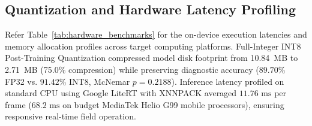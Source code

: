 \documentclass[conference,a4paper]{IEEEtran}
\begin{document}
\begin{table}[htbp]
\caption{Empirical Per-Class Evaluation on Test Set ($N=233$)}
\vspace{-2.5mm}
\centering
{}
\label{tab:metrics}
\vspace{-2.5mm}
\end{table}

\subsection{Quantization and Hardware Latency Profiling}
Refer Table~\ref{tab:hardware_benchmarks} for the on-device execution latencies and memory allocation profiles across target computing platforms. Full-Integer INT8 Post-Training Quantization compressed model disk footprint from 10.84~MB to 2.71~MB (75.0\% compression) while preserving diagnostic accuracy ($89.70\%$ FP32 vs. $91.42\%$ INT8, McNemar $p=0.2188$). Inference latency profiled on standard CPU using Google LiteRT with XNNPACK averaged $11.76\text{ ms}$ per frame ($68.2\text{ ms}$ on budget MediaTek Helio G99 mobile processors), ensuring responsive real-time field operation.
\end{document}
